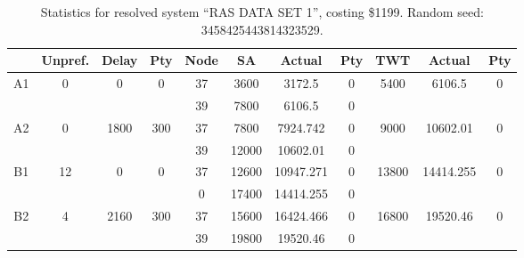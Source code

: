 \begin{sidewaystable}
\footnotesize
\caption{Statistics for resolved system ``RAS DATA SET 1'', costing \$1199. Random seed: 3458425443814323529.}
\centering
\begin{tabular}{c||c|c|c||c|c|c|c||c|c|c}
  \hline \hline
  &
  Unpref. & 
  Delay &
  Pty &
  Node &
  SA &
  Actual &
  Pty &
  TWT &
  Actual &
  Pty \\
      \hline
      \multirow{2}{*}{A1} &
      \multirow{2}{*}{0} &
      \multirow{2}{*}{0} &
      \multirow{2}{*}{0} &
      37 &
      3600 &
        3172.5 &
        0 &
      \multirow{2}{*}{5400} &
        \multirow{2}{*}{6106.5} &
        \multirow{2}{*}{0}
      \\
      \cline{5-8}
       &
       &
       &
       &
      39 &
      7800 &
        6106.5 &
        0 &
      
         &
        
      \\
      \hline
      \multirow{2}{*}{A2} &
      \multirow{2}{*}{0} &
      \multirow{2}{*}{1800} &
      \multirow{2}{*}{300} &
      37 &
      7800 &
        7924.742 &
        0 &
      \multirow{2}{*}{9000} &
        \multirow{2}{*}{10602.01} &
        \multirow{2}{*}{0}
      \\
      \cline{5-8}
       &
       &
       &
       &
      39 &
      12000 &
        10602.01 &
        0 &
      
         &
        
      \\
      \hline
      \multirow{2}{*}{B1} &
      \multirow{2}{*}{12} &
      \multirow{2}{*}{0} &
      \multirow{2}{*}{0} &
      37 &
      12600 &
        10947.271 &
        0 &
      \multirow{2}{*}{13800} &
        \multirow{2}{*}{14414.255} &
        \multirow{2}{*}{0}
      \\
      \cline{5-8}
       &
       &
       &
       &
      0 &
      17400 &
        14414.255 &
        0 &
      
         &
        
      \\
      \hline
      \multirow{2}{*}{B2} &
      \multirow{2}{*}{4} &
      \multirow{2}{*}{2160} &
      \multirow{2}{*}{300} &
      37 &
      15600 &
        16424.466 &
        0 &
      \multirow{2}{*}{16800} &
        \multirow{2}{*}{19520.46} &
        \multirow{2}{*}{0}
      \\
      \cline{5-8}
       &
       &
       &
       &
      39 &
      19800 &
        19520.46 &
        0 &
      

\end{tabular}
\end{sidewaystable}

